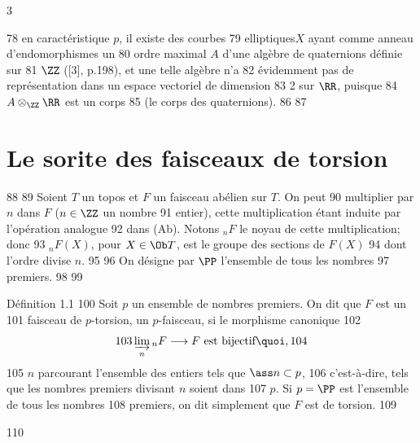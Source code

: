 3	\documentclass[10pt]{../fichiers-configuration-latex/smfart}
\begin{document}
    78	en caractéristique $p$, il existe des courbes
    79	elliptiques\pageoriginale $X$ ayant comme anneau d'endomorphismes un
    80	ordre maximal $A$ d'une algèbre de quaternions définie sur
    81	$\ZZ$ ([3], p.198), et une telle algèbre n'a
    82	évidemment pas de représentation dans un espace vectoriel de dimension
    83	2 sur $\RR$, puisque
    84	$A\otimes_{\ZZ}\RR$ est un corps
    85	(le corps des quaternions).
    86	
    87	\section{Le sorite des faisceaux de torsion}
    88	
    89	Soient $T$ un topos et $F$ un faisceau abélien sur $T$. On peut
    90	multiplier par $n$ dans $F$ ($n\in \ZZ$ un nombre
    91	entier), cette multiplication étant induite par l'opération analogue
    92	dans (Ab). Notons ${}_nF$ le noyau de cette multiplication; donc
    93	${}_nF(X)$, pour $X\in \Ob T$, est le groupe des sections de $F(X)$
    94	dont l'ordre divise $n$.
    95	
    96	On désigne par $\PP$ l'ensemble de tous les nombres
    97	premiers.
    98	
    99	\begin{enonce*}{Définition 1.1}
   100	Soit $p$ un ensemble de nombres premiers. On dit que $F$ est un
   101	faisceau de $p$-torsion,  un $p$-faisceau, si le morphisme canonique
   102	$$
   103	\varinjlim_n {}_nF\longrightarrow F\text{ est bijectif}{\quoi},
   104	$$
   105	$n$ parcourant l'ensemble des entiers tels que $\ass n\subset p$,
   106	c'est-à-dire, tels que les nombres premiers divisant $n$ soient dans
   107	$p$. Si $p=\PP$ est l'ensemble de tous les nombres
   108	premiers, on dit simplement que $F$ est de torsion.
   109	\end{enonce*}
   110	
\end{document}
